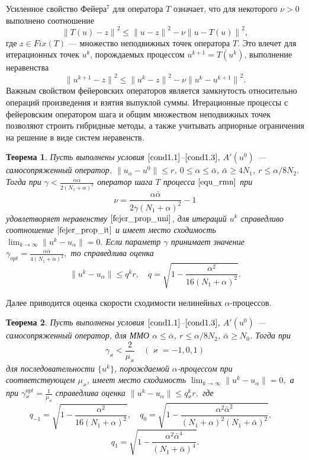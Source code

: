 \documentclass[%
autoref,     %
href,        %
facsimile,   %
colorlinks,  %
]{disser}
\newtheorem{theorem}{Теорема}
\begin{document}
Усиленное свойство Фейера$^7$ для оператора $T$ означает, что для некоторого $\nu>0$ выполнено соотношение
\begin{equation}\label{fejer_prop_uni}
{\|T(u)-z\|}^2\leqslant{\|u-z\|}^2-\nu{\|u-T(u)\|}^2,
\end{equation}
где $z\in Fix(T)$ --- множество неподвижных точек оператора $T$. Это влечет для итерационных точек $u^k$, порождаемых процессом $u^{k+1}=T(u^k)$, выполнение неравенства
\begin{equation}\label{fejer_prop_it}
{\|u^{k+1}-z\|}^2\leqslant{\|u^k-z\|}^2-\nu{\|u^k-u^{k+1}\|}^2.
\end{equation}
{\scriptsize
\let\thefootnote\relax\let\thefootnote\relax{}}
Важным свойством фейеровских операторов является замкнутость относительно операций произведения и взятия выпуклой суммы. Итерационные процессы с фейеровским оператором шага и общим множеством неподвижных точек позволяют строить гибридные методы, а также учитывать априорные ограничения на решение в виде систем неравенств.

\begin{theorem} \label{teo2.3}
	Пусть выполнены условия $\eqref{cond1.1}$--$\eqref{cond1.3}$, $A'(u^0)$ --- самосопряженный оператор, $\|u_\alpha-u^0\|\leqslant r$, 
$0\leqslant\alpha\leqslant\bar\alpha$, $\bar\alpha\geqslant 4N_1$, $r\leqslant\alpha/8N_2$. Тогда при
	$\gamma<\frac{\alpha\bar\alpha}{2(N_1+\alpha)^2}$
	оператор шага $T$ процесса $\eqref{equ_rmn}$ при
	$$\nu=\frac{\alpha\bar\alpha}{2\gamma(N_1+\alpha)^2}-1$$
	удовлетворяет неравенству $\eqref{fejer_prop_uni}$, для итераций $u^k$ справедливо соотношение $\eqref{fejer_prop_it}$ и имеет место сходимость
	$\lim_{k\to\infty}\|u^k-u_\alpha\|=0.$
	Если параметр $\gamma$ принимает значение ${\gamma}_{opt}=\frac{\alpha\bar\alpha}{4(N_1+\alpha)^2},$ то справедлива оценка $$\|u^k-u_\alpha\|\leqslant q^k r, \quad q=\sqrt{1-\frac{{\alpha}^2}  {16(N_1+\alpha)^2}}.$$
\end{theorem}

Далее приводится оценка скорости сходимости нелинейных $\alpha$-процессов.
\begin{theorem}\label{teo3.2}
	Пусть выполнены условия $\eqref{cond1.1}$--$\eqref{cond1.3}$, $A'(u^0)$ --- самосопряженный оператор, для ММО $\alpha \leqslant \bar\alpha$,  $r\leqslant \alpha/8N_2$, $\bar\alpha \geqslant N_0$.  Тогда при
	$$\gamma _\varkappa <\frac{2}{\mu _\varkappa}\quad (\varkappa=-1,0,1)$$
	для последовательности $\{u^k\}$, порождаемой $\alpha$-процессом при соответствующем $\mu_\varkappa$, имеет место сходимость $\lim_{k\to\infty}\|u^k-u_\alpha\|=0, $ а при 
	$\gamma{_\varkappa^{opt}}=\frac{1}{\mu_\varkappa}$
	справедлива оценка $\|u^k-u_\alpha\|\leqslant q{_\varkappa^k}r,$ где
	$$
	q_{-1}=\sqrt{1-\frac{\alpha^2}{16(N_1+\alpha)^2}}, \quad q_0=\sqrt{1-\frac{\alpha^2\bar\alpha^2}{(N_1+\alpha)^2(N_1+\bar\alpha)^2}}, \quad $$$$q_1=\sqrt{1-\frac{\alpha^2\bar\alpha^4}{(N_1+\bar\alpha)^4}}.
	$$
\end{theorem}
\end{document}
